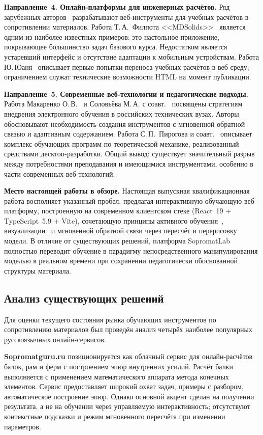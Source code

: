 \textbf{Направление~4. Онлайн-платформы для инженерных расчётов.} Ряд зарубежных авторов~\cite{philpot2003, yuan2002, panagiotopoulos2016} разрабатывают веб-инструменты для учебных расчётов в сопротивлении материалов. Работа Т.\,А.~Филпота <<MDSolids>>~\cite{philpot2003} является одним из наиболее известных примеров: это настольное приложение, покрывающее большинство задач базового курса. Недостатком является устаревший интерфейс и отсутствие адаптации к мобильным устройствам. Работа Ю.\,Юаня~\cite{yuan2002} описывает первые попытки переноса учебных расчётов в веб-среду; ограничением служат технические возможности HTML на момент публикации.

\textbf{Направление~5. Современные веб-технологии и педагогические подходы.} Работа Макаренко О.\,В.~\cite{makarenko} и Соловьёва М.\,А. с соавт.~\cite{solovyev} посвящены стратегиям внедрения электронного обучения в российских технических вузах. Авторы обосновывают необходимость создания инструментов с мгновенной обратной связью и адаптивным содержанием. Работа С.\,П.~Пирогова и соавт.~\cite{pirogov} описывает комплекс обучающих программ по теоретической механике, реализованный средствами десктоп-разработки. Общий вывод: существует значительный разрыв между потребностями преподавания и имеющимися инструментами, особенно в части современных веб-технологий.

\textbf{Место настоящей работы в обзоре.} Настоящая выпускная квалификационная работа восполняет указанный пробел, предлагая интерактивную обучающую веб-платформу, построенную на современном клиентском стеке (React~19 + TypeScript~5.9 + Vite), сочетающую принципы активного обучения~\cite{freeman2014}, визуализации~\cite{balandina} и мгновенной обратной связи через пересчёт и перерисовку модели. В отличие от существующих решений, платформа SopromatLab полностью переводит обучение в парадигму непосредственного манипулирования моделью в реальном времени при сохранении педагогически обоснованной структуры материала.

\subsection*{Анализ существующих решений}

Для оценки текущего состояния рынка обучающих инструментов по сопротивлению материалов был проведён анализ четырёх наиболее популярных русскоязычных онлайн-сервисов.

\textbf{Sopromatguru.ru} позиционируется как облачный сервис для онлайн-расчётов балок, рам и ферм с построением эпюр внутренних усилий. Расчёт балки выполняется с применением математического аппарата метода конечных элементов. Сервис предоставляет широкий охват задач, примеры с разбором, автоматическое построение эпюр. Однако основной акцент сделан на получении результата, а не на обучении через управляемую интерактивность; отсутствуют контекстные подсказки и режим мгновенного пересчёта при изменении параметров.

